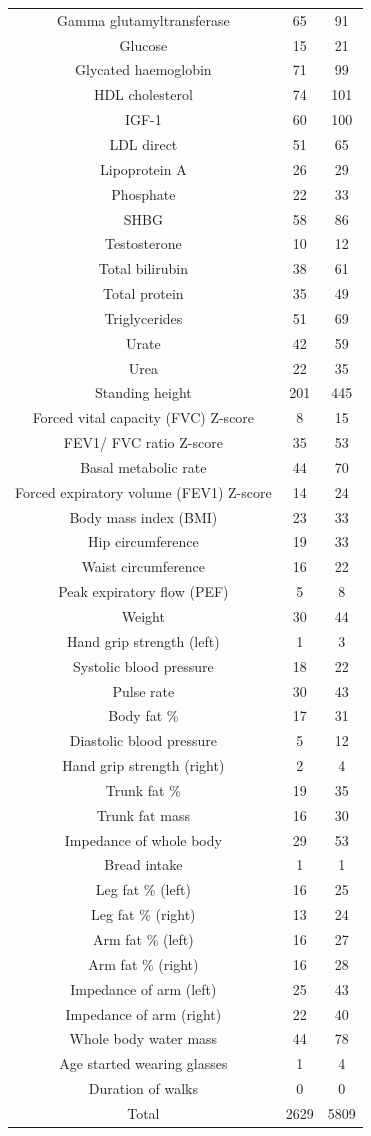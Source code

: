 \begin{small}
\begin{longtable}[h!]{|c|c|c|}
Gamma glutamyltransferase & 65 & 91 \\
Glucose & 15 & 21 \\
Glycated haemoglobin & 71 & 99 \\
HDL cholesterol & 74 & 101 \\
IGF-1 & 60 & 100 \\
LDL direct & 51 & 65 \\
Lipoprotein A & 26 & 29 \\
Phosphate & 22 & 33 \\
SHBG & 58 & 86 \\
Testosterone & 10 & 12 \\
Total bilirubin & 38 & 61 \\
Total protein & 35 & 49 \\
Triglycerides & 51 & 69 \\
Urate & 42 & 59 \\
Urea & 22 & 35 \\
Standing height & 201 & 445 \\
Forced vital capacity (FVC) Z-score & 8 & 15 \\
FEV1/ FVC ratio Z-score & 35 & 53 \\
Basal metabolic rate & 44 & 70 \\
Forced expiratory volume (FEV1) Z-score & 14 & 24 \\
Body mass index (BMI) & 23 & 33 \\
Hip circumference & 19 & 33 \\
Waist circumference & 16 & 22 \\
Peak expiratory flow (PEF) & 5 & 8 \\
Weight & 30 & 44 \\
Hand grip strength (left) & 1 & 3 \\
Systolic blood pressure & 18 & 22 \\
Pulse rate & 30 & 43 \\
Body fat \% & 17 & 31 \\
Diastolic blood pressure & 5 & 12 \\
Hand grip strength (right) & 2 & 4 \\
Trunk fat \% & 19 & 35 \\
Trunk fat mass & 16 & 30 \\
Impedance of whole body & 29 & 53 \\
Bread intake & 1 & 1 \\
Leg fat \% (left) & 16 & 25 \\
Leg fat \% (right) & 13 & 24 \\
Arm fat \% (left) & 16 & 27 \\
Arm fat \% (right) & 16 & 28 \\
Impedance of arm (left) & 25 & 43 \\
Impedance of arm (right) & 22 & 40 \\
Whole body water mass & 44 & 78 \\
Age started wearing glasses & 1 & 4 \\
Duration of walks & 0 & 0 \\
\hline
 Total & 2629 & 5809
\label{tab:loci_wgwa}
\end{longtable}
\end{small}

